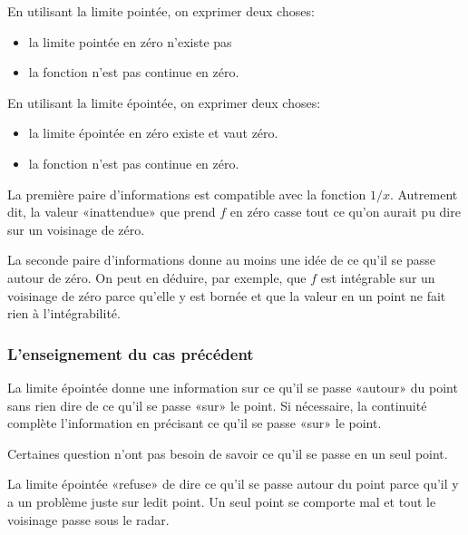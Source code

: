 En utilisant la limite pointée, on exprimer deux choses:
\begin{itemize}
    \item la limite pointée en zéro n'existe pas
    \item la fonction n'est pas continue en zéro.
\end{itemize}

En utilisant la limite épointée, on exprimer deux choses:
\begin{itemize}
    \item la limite épointée en zéro existe et vaut zéro.
    \item la fonction n'est pas continue en zéro.
\end{itemize}

La première paire d'informations est compatible avec la fonction \( 1/x\). Autrement dit, la valeur «inattendue» que prend \( f\) en zéro casse tout ce qu'on aurait pu dire sur un voisinage de zéro.

La seconde paire d'informations donne au moins une idée de ce qu'il se passe autour de zéro. On peut en déduire, par exemple, que \( f\) est intégrable sur un voisinage de zéro parce qu'elle y est bornée et que la valeur en un point ne fait rien à l'intégrabilité.

\subsubsection{L'enseignement du cas précédent}

La limite épointée donne une information sur ce qu'il se passe «autour» du point sans rien dire de ce qu'il se passe «sur» le point. Si nécessaire, la continuité complète l'information en précisant ce qu'il se passe «sur» le point.

Certaines question n'ont pas besoin de savoir ce qu'il se passe en un seul point.

La limite épointée «refuse» de dire ce qu'il se passe autour du point parce qu'il y a un problème juste sur ledit point. Un seul point se comporte mal et tout le voisinage passe sous le radar.

